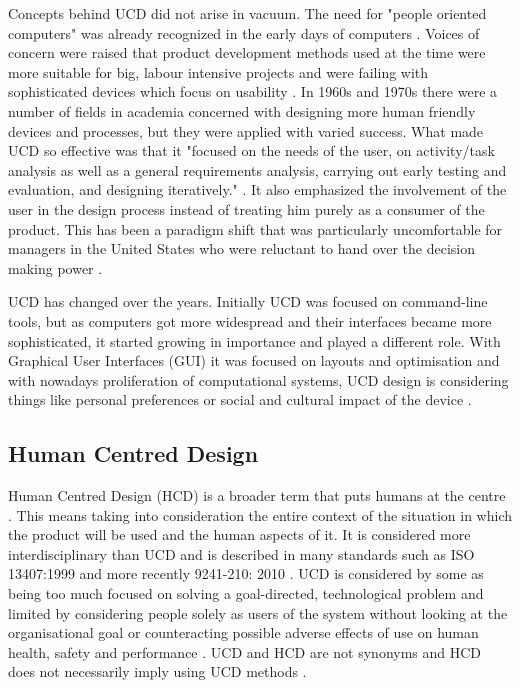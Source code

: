 Concepts behind UCD did not arise in vacuum. The need for "people oriented computers" was already recognized in the early days of computers \citep{ritter2014foundations, nickerson1969man}. Voices of concern were raised that product development methods used at the time were more suitable for big, labour intensive projects and were failing with sophisticated devices which focus on usability \citep{greenbaum1993design, robert1965new}. In 1960s and 1970s there were a number of fields in academia concerned with designing more human friendly devices and processes, but they were applied with varied success. What made UCD so effective was that it "focused on the needs of the user, on activity/task analysis as well as a general requirements analysis, carrying out early testing and evaluation, and designing iteratively." \citep{ritter2014foundations}. It also emphasized the involvement of the user in the design process instead of treating him purely as a consumer of the product. This has been a paradigm shift that was particularly uncomfortable for managers in the United States who were reluctant to hand over the decision making power \citep{greenbaum1993design}.

UCD has changed over the years.  Initially UCD was focused on command-line tools, but as computers got more widespread and their interfaces became more sophisticated, it started growing in importance and played a different role. With Graphical User Interfaces (GUI) it was focused on layouts and optimisation and with nowadays proliferation of computational systems, UCD design is considering things like personal preferences or social and cultural impact of the device \citep{ritter2014foundations}.

		\subsection{Human Centred Design}

Human Centred Design (HCD) is a broader term that puts humans at the centre \citep{ritter2014foundations, Earthy2001, iso199913407, 1_kurosu_2011}. This means taking into consideration the entire context of the situation in which the product will be used and the human aspects of it. It is considered more interdisciplinary than UCD and is described in many standards \citep{Bevan2001} such as ISO 13407:1999 \citep{iso199913407} and more recently 9241-210: 2010 \citep{dis20099241}. UCD is considered by some as being too much focused on solving a goal-directed, technological problem and limited by considering people solely as users of the system without looking at the organisational goal or counteracting possible adverse effects of use on human health, safety and performance \citep{gasson2003human, gill1996foundations, Bevan2001}. UCD and HCD are not synonyms and HCD does not necessarily imply using UCD methods \citep{Earthy2001, Maguire2001, 1_kurosu_2011, ritter2014foundations}. 
		

